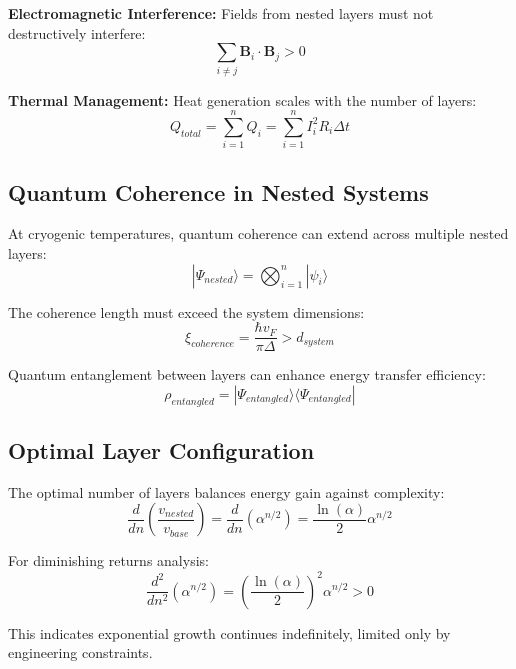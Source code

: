 \documentclass[12pt,a4paper]{article}
\begin{document}
\textbf{Electromagnetic Interference:}
Fields from nested layers must not destructively interfere:
\begin{equation}
\sum_{i \neq j} \mathbf{B}_i \cdot \mathbf{B}_j > 0
\end{equation}

\textbf{Thermal Management:}
Heat generation scales with the number of layers:
\begin{equation}
Q_{total} = \sum_{i=1}^{n} Q_i = \sum_{i=1}^{n} I_i^2 R_i \Delta t
\end{equation}

\subsection{Quantum Coherence in Nested Systems}

At cryogenic temperatures, quantum coherence can extend across multiple nested layers:
\begin{equation}
|\Psi_{nested}\rangle = \bigotimes_{i=1}^{n} |\psi_i\rangle
\end{equation}

The coherence length must exceed the system dimensions:
\begin{equation}
\xi_{coherence} = \frac{\hbar v_F}{\pi \Delta} > d_{system}
\end{equation}

Quantum entanglement between layers can enhance energy transfer efficiency:
\begin{equation}
\rho_{entangled} = |\Psi_{entangled}\rangle \langle \Psi_{entangled}|
\end{equation}

\subsection{Optimal Layer Configuration}

The optimal number of layers balances energy gain against complexity:
\begin{equation}
\frac{d}{dn}\left(\frac{v_{nested}}{v_{base}}\right) = \frac{d}{dn}(\alpha^{n/2}) = \frac{\ln(\alpha)}{2}\alpha^{n/2}
\end{equation}

For diminishing returns analysis:
\begin{equation}
\frac{d^2}{dn^2}(\alpha^{n/2}) = \left(\frac{\ln(\alpha)}{2}\right)^2 \alpha^{n/2} > 0
\end{equation}

This indicates exponential growth continues indefinitely, limited only by engineering constraints.
\end{document}
